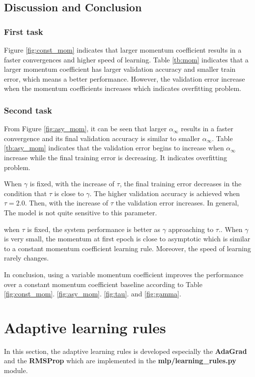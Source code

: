 \documentclass[11pt]{article}
\begin{document}
\subsection{Discussion and Conclusion}
\subsubsection{First task}
Figure \ref{fig:const_mom} indicates that larger momentum coefficient results in a faster convergences and higher speed of learning. Table \ref{tb:mom} indicates that a larger momentum coefficient has larger validation accuracy and smaller train error, which means a better performance. However, the validation error increase when the momentum coefficients increases which indicates overfitting problem.
\subsubsection{Second task}
From Figure \ref{fig:asy_mom}, it can be seen that larger $\alpha_\infty$ results in a faster convergence and its final validation accuracy is similar to smaller $\alpha_\infty$. Table \ref{tb:asy_mom} indicates that the validation error begins to increase when $\alpha_\infty$ increase while the final training error is decreasing. It indicates overfitting problem.

When $\gamma$ is fixed, with the increase of $\tau$, the final training error decreases in the condition that $\tau$ is close to $\gamma$. The higher validation accuracy is achieved when $\tau = 2.0$. Then, with the increase of $\tau$ the validation error increases. In general, The model is not quite sensitive to this parameter.

when $\tau$ is fixed, the system performance is better as $\gamma$ approaching to $\tau$.. When $\gamma$ is very small, the momentum at first epoch is close to asymptotic which is similar to a constant momentum coefficient learning rule. Moreover, the speed of learning rarely changes. 

In conclusion, using a variable momentum coefficient improves the performance over a constant momentum coefficient  baseline according to Table \ref{fig:const_mom}. \ref{fig:asy_mom}. \ref{fig:tau}. and \ref{fig:gamma}.
\newpage
\section{Adaptive learning rules}
In this section, the adaptive learning rules is developed especially the {\bf AdaGrad} and the {\bf RMSProp} which are implemented in the {\bf mlp/learning\_rules.py} module. 
\end{document}
